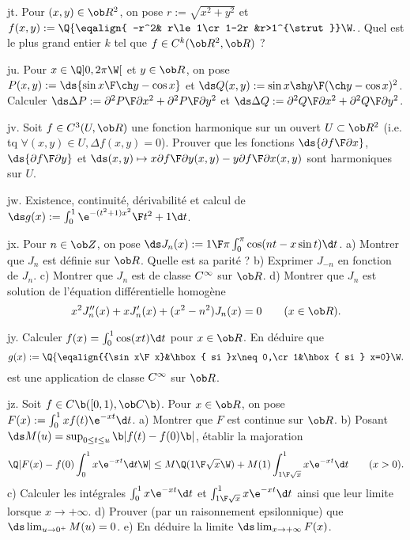 \exo [Level=2,Fight=1,Learn=1,Field=\FonctionsDePlusieursVariables,Type=\Exercices,Origin=] jt. 
Pour $(x,y)\in\ob R^2$, on pose $r:=\sqrt{x^2+y^2}$ 
et $f(x,y):=\Q\{\eqalign{
-r^2& r\le1\cr 1-2r &r>1^{\strut}}\W.$. \pn
Quel est le plus grand entier $k$ tel que $f\in\sc C^k(\ob R^2,\ob R)$ ?   

\exo [Level=2,Fight=0,Learn=0,Field=\FonctionsDePlusieursVariables,Type=\Exercices,Origin=] ju. 
Pour $x\in\Q]0,2\pi\W[$ et $y\in\ob R$, on pose $P(x,y):=\ds{\sin x\F\ch y-\cos x}$ 
et $\ds Q(x,y):={\sin x\sh y\F(\ch y-\cos x)^2}$. \pn
Calculer $\ds\Delta P:={\partial^2P\F\partial x^2}+{\partial^2P\F\partial y^2}$ 
et $\ds\Delta Q:={\partial^2Q\F\partial x^2}+{\partial^2Q\F\partial y^2}$. 

\exo [Level=2,Fight=1,Learn=1,Field=\FonctionsDePlusieursVariables,Type=\Exercices,Origin=] jv. 
Soit $f\in\sc C^3(U,\ob R)$ une fonction harmonique sur un ouvert $U\subset\ob R^2$ 
(i.e. tq $\forall(x,y)\in U,\Delta f(x,y)=0$). \pn
Prouver que les fonctions $\ds {\partial f\F\partial x}$, $\ds{\partial f\F\partial y}$ 
et $\ds(x,y)\mapsto x{\partial f\F\partial y}(x,y)-y{\partial f\F\partial x}(x,y)$ sont harmoniques sur $U$. 

\exo [Level=2,Fight=1,Learn=1,Field=\FonctionsDéfiniesParUneIntégrale,Type=\Exercices,Origin=] jw. 
Existence, continuité, dérivabilité et calcul de 
$\ds g(x):=\int_0^1{\e^{-(t^2+1)x^2}\F t^2+1}\d t$. 

\exo [Level=2,Fight=2,Learn=2,Field=\FonctionsDéfiniesParUneIntégrale,Type=\Exercices,Origin=] jx. 
Pour $n\in\ob Z$, on pose $\ds J_n(x):={1\F\pi}\int_0^\pi\cos(nt-x\sin t)\d t$. \pn
a) Montrer que $J_n$ est définie sur $\ob R$. Quelle est sa parité ? \pn
b) Exprimer $J_{-n}$ en fonction de $J_n$. \pn
c) Montrer que $J_n$ est de classe $\sc C^\infty$ sur $\ob R$. \pn
d) Montrer que $J_n$ est solution de l'équation différentielle homogène 
$$
x^2J_n''(x)+xJ_n'(x)+(x^2-n^2)J_n(x)=0\qquad(x\in\ob R).
$$

\exo [Level=2,Fight=0,Learn=1,Field=\FonctionsDéfiniesParUneIntégrale,Type=\Exercices,Origin=] jy. 
Calculer $f(x)=\int_0^1\cos(xt)\d t$ pour $x\in\ob R$. En déduire que 
$$
g(x):=\Q\{\eqalign{{\sin x\F x}&\hbox{ si }x\neq0,\cr 1&\hbox{ si } x=0}\W.
$$ 
est une application de classe $\sc C^\infty$ sur $\ob R$. 

\exo [Level=2,Fight=2,Learn=2,Field=\FonctionsDéfiniesParUneIntégrale,Type=\Exercices,Origin=] jz. 
Soit $f\in\sc C\b([0,1),\ob C\b)$. Pour $x\in\ob R$, on pose $F(x):=\int_0^1 xf(t)\e^{-xt}\d t$. \pn
a) Montrer que $F$ est continue sur $\ob R$. \pn
b) Posant $\ds M(u) = \sup_{0\le t\le u}\b|f(t) - f(0)\b|$, établir la majoration
$$
\Q|F(x)-f(0)\int_0^1 x\e^{-xt}\d t\W| \le M\Q({1\F \sqrt x}\W) + M(1)\int_{1\F\sqrt x}^1 x\e^{-xt}\d t\qquad(x>0).
$$
c) Calculer les intégrales $\int_0^1 x\e^{-xt}\d t$ et $\int_{1\F\sqrt x}^1 x\e^{-xt}\d t$ ainsi que leur limite lorsque $x\to+\infty$. \pn
d) Prouver (par un raisonnement epsilonnique) que $\ds\lim_{u\to 0^+}M(u)=0$. \pn
e) En déduire la limite $\ds\lim_{x\to+\infty}F(x)$. 

